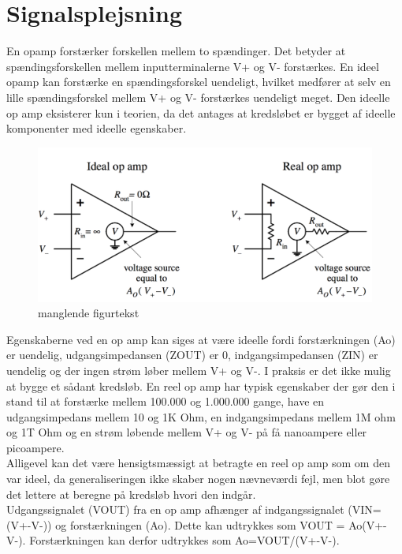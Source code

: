 \section{Signalsplejsning} 
\label{Signalsplejsning} 
En opamp forstærker forskellen mellem to spændinger. Det betyder at spændingsforskellen mellem inputterminalerne V+ og V- forstærkes. En ideel opamp kan forstærke en spændingsforskel uendeligt, hvilket medfører at selv en lille spændingsforskel mellem V+ og V- forstærkes uendeligt meget.    
Den ideelle op amp eksisterer kun i teorien, da det antages at kredsløbet er bygget af ideelle komponenter med ideelle egenskaber.
%
\begin{figure}[H]
\centering
\includegraphics[resolution=300,width=\textwidth]{Figure/Introduktion/IdealRealOpAmp.png}
\caption{manglende figurtekst}
\label{fig:IdealRealOpAmp}
\end{figure}
\noindent
%
Egenskaberne ved en op amp kan siges at være ideelle fordi forstærkningen (Ao) er uendelig, udgangsimpedansen (ZOUT) er 0, indgangsimpedansen (ZIN) er uendelig og der ingen strøm løber mellem V+ og V-. I praksis er det ikke mulig at bygge et sådant kredsløb. En reel op amp har typisk egenskaber der gør den i stand til at forstærke mellem 100.000 og 1.000.000 gange, have en udgangsimpedans mellem 10 og 1K Ohm, en indgangsimpedans mellem 1M ohm og 1T Ohm og en strøm løbende mellem V+ og V- på få nanoampere eller picoampere.\\
%
Alligevel kan det være hensigtsmæssigt at betragte en reel op amp som om den var ideel,  da generaliseringen ikke skaber nogen nævneværdi fejl, men blot gøre det lettere at beregne på kredsløb hvori den indgår.\\
%
Udgangssignalet (VOUT) fra en op amp afhænger af indgangssignalet (VIN=(V+-V-)) og forstærkningen (Ao). Dette kan udtrykkes som VOUT = Ao(V+-V-). Forstærkningen kan derfor udtrykkes som Ao=VOUT/(V+-V-).    
%
